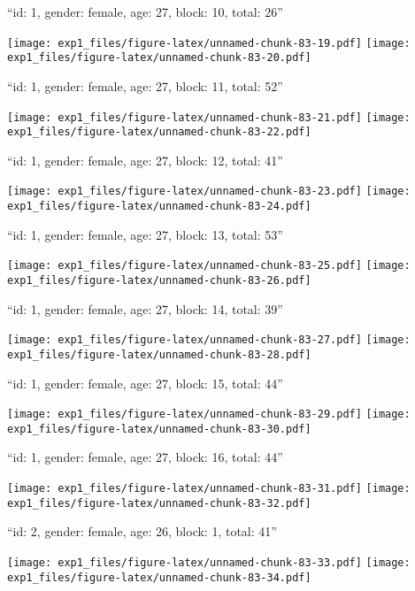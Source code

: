 \documentclass[11pt,,]{article}
\begin{document}
``id: 1, gender: female, age: 27, block: 10, total: 26''

\texttt{[image: exp1\_files/figure-latex/unnamed-chunk-83-19.pdf]}
\texttt{[image: exp1\_files/figure-latex/unnamed-chunk-83-20.pdf]}

\newpage
[1] 

``id: 1, gender: female, age: 27, block: 11, total: 52''

\texttt{[image: exp1\_files/figure-latex/unnamed-chunk-83-21.pdf]}
\texttt{[image: exp1\_files/figure-latex/unnamed-chunk-83-22.pdf]}

\newpage
[1] 

``id: 1, gender: female, age: 27, block: 12, total: 41''

\texttt{[image: exp1\_files/figure-latex/unnamed-chunk-83-23.pdf]}
\texttt{[image: exp1\_files/figure-latex/unnamed-chunk-83-24.pdf]}

\newpage
[1] 

``id: 1, gender: female, age: 27, block: 13, total: 53''

\texttt{[image: exp1\_files/figure-latex/unnamed-chunk-83-25.pdf]}
\texttt{[image: exp1\_files/figure-latex/unnamed-chunk-83-26.pdf]}

\newpage
[1] 

``id: 1, gender: female, age: 27, block: 14, total: 39''

\texttt{[image: exp1\_files/figure-latex/unnamed-chunk-83-27.pdf]}
\texttt{[image: exp1\_files/figure-latex/unnamed-chunk-83-28.pdf]}

\newpage
[1] 

``id: 1, gender: female, age: 27, block: 15, total: 44''

\texttt{[image: exp1\_files/figure-latex/unnamed-chunk-83-29.pdf]}
\texttt{[image: exp1\_files/figure-latex/unnamed-chunk-83-30.pdf]}

\newpage
[1] 

``id: 1, gender: female, age: 27, block: 16, total: 44''

\texttt{[image: exp1\_files/figure-latex/unnamed-chunk-83-31.pdf]}
\texttt{[image: exp1\_files/figure-latex/unnamed-chunk-83-32.pdf]}

\newpage
[1] 

``id: 2, gender: female, age: 26, block: 1, total: 41''

\texttt{[image: exp1\_files/figure-latex/unnamed-chunk-83-33.pdf]}
\texttt{[image: exp1\_files/figure-latex/unnamed-chunk-83-34.pdf]}

\newpage
[1] 
\end{document}
